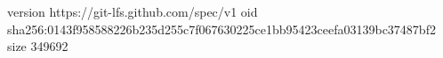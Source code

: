 version https://git-lfs.github.com/spec/v1
oid sha256:0143f958588226b235d255c7f067630225ce1bb95423ceefa03139bc37487bf2
size 349692
